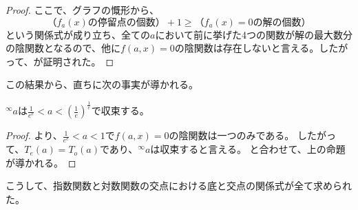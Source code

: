 \begin{proof}
		ここで、グラフの慨形から、
		\[
			\text{（$f_a(x)$の停留点の個数）} + 1 \geq \text{（$f_a(x)=0$の解の個数）}
		\]
		という関係式が成り立ち、全ての$a$において前に挙げた4つの関数が解の最大数分の陰関数となるので、他に$f(a,x)=0$の陰関数は存在しないと言える。したがって、が証明された。
	\end{proof}
	
	この結果から、直ちに次の事実が導かれる。
	\begin{theorem}
	\label{th:tetration_convergence}
		${^\infty a}$は$\frac{1}{e^e} < a < \left ( \frac{1}{e} \right )^{\frac{1}{e}}$で収束する。
	\end{theorem}
	\begin{proof}
		より、$\frac{1}{e^e} < a < 1$で$f(a,x)=0$の陰関数は一つのみである。
		したがって、$T_e(a) = T_o(a)$であり、${^\infty a}$は収束すると言える。
		と合わせて、上の命題が導かれる。
	\end{proof}
	
	こうして、指数関数と対数関数の交点における底と交点の関係式が全て求められた。
	